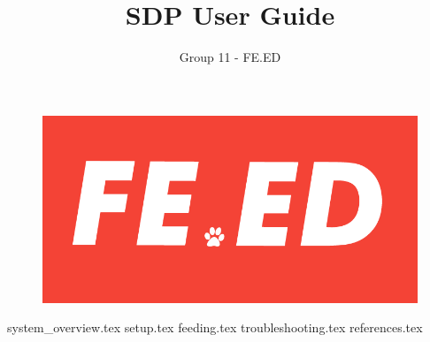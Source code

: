 \documentclass{article}
\begin{document}
\renewcommand*{\contentsname}{\color{DarkBlue}\Huge Contents}

\title{\color{DarkBlue}\Huge SDP User Guide}
\author{\color{MediumBlue}\Large Group 11 - FE.ED}
\date{}

\begin{titlepage}
\maketitle
\begin{figure}[h]
    \centering
    \includegraphics{logo.png}
\end{figure}


\end{titlepage}


\tableofcontents
\pagebreak

{system_overview.tex}
{setup.tex}
{feeding.tex}
{troubleshooting.tex}
{references.tex}
\end{document}
